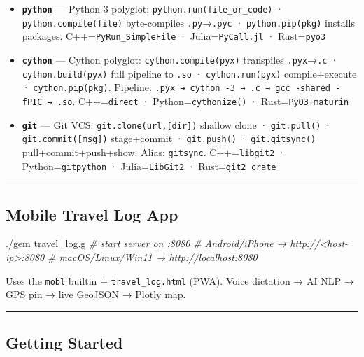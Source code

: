 \documentclass[
]{article}
\newenvironment{Shaded}{}{}
\newcommand{\CommentTok}[1]{\textcolor[rgb]{0.38,0.63,0.69}{\textit{#1}}}
\newcommand{\ExtensionTok}[1]{#1}
\newcommand{\NormalTok}[1]{#1}
\begin{document}
\begin{itemize}
\item
  \textbf{\texttt{python}} --- Python 3 polyglot:
  \texttt{python.run(file\_or\_code)} · \texttt{python.compile(file)}
  byte-compiles \texttt{.py}→\texttt{.pyc} · \texttt{python.pip(pkg)}
  installs packages. C++=\texttt{PyRun\_SimpleFile} ·
  Julia=\texttt{PyCall.jl} · Rust=\texttt{pyo3}
\item
  \textbf{\texttt{cython}} --- Cython polyglot:
  \texttt{cython.compile(pyx)} transpiles \texttt{.pyx}→\texttt{.c} ·
  \texttt{cython.build(pyx)} full pipeline to \texttt{.so} ·
  \texttt{cython.run(pyx)} compile+execute · \texttt{cython.pip(pkg)}.
  Pipeline:
  \texttt{.pyx\ →\ cython\ -3\ →\ .c\ →\ gcc\ -shared\ -fPIC\ →\ .so}.
  C++=\texttt{direct} · Python=\texttt{cythonize()} ·
  Rust=\texttt{PyO3+maturin}
\item
  \textbf{\texttt{git}} --- Git VCS: \texttt{git.clone(url,{[}dir{]})}
  shallow clone · \texttt{git.pull()} · \texttt{git.commit({[}msg{]})}
  stage+commit · \texttt{git.push()} · \texttt{git.gitsync()}
  pull+commit+push+show. Alias: \texttt{gitsync}. C++=\texttt{libgit2} ·
  Python=\texttt{gitpython} · Julia=\texttt{LibGit2} ·
  Rust=\texttt{git2\ crate}
\end{itemize}

\begin{center}\rule{0.5\linewidth}{0.5pt}\end{center}

\subsection{Mobile Travel Log App}\label{mobile-travel-log-app}

\begin{Shaded}
\begin{Highlighting}[]
\ExtensionTok{./gem}\NormalTok{ travel\_log.g          }\CommentTok{\# start server on :8080}
\CommentTok{\# Android/iPhone → http://\textless{}host{-}ip\textgreater{}:8080}
\CommentTok{\# macOS/Linux/Win11 → http://localhost:8080}
\end{Highlighting}
\end{Shaded}

Uses the \texttt{mobl} builtin + \texttt{travel\_log.html} (PWA). Voice
dictation → AI NLP → GPS pin → live GeoJSON → Plotly map.

\begin{center}\rule{0.5\linewidth}{0.5pt}\end{center}

\subsection{Getting Started}\label{getting-started}
\end{document}

